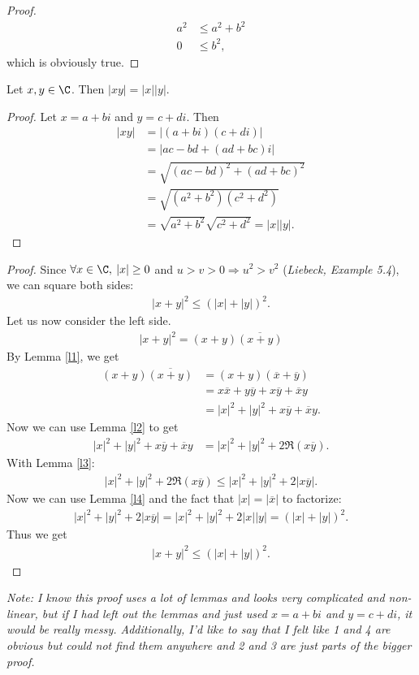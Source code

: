 \documentclass{article}
\begin{document}
\begin{adjustwidth}{2em}{0pt}
\begin{proof}
		\begin{align*}
			a^2 & \leq a^2+b^2 \\
			0   & \leq b^2,
		\end{align*}
		which is obviously true.
	\end{proof}
	\begin{lemma}
		\label{l4}
		Let $x,y\in\C$. Then $|xy|=|x||y|$.
	\end{lemma}
	\begin{proof}
		Let $x=a+bi$ and $y=c+di$. Then
		\begin{align*}
			|xy| & =|(a+bi)(c+di)|                       \\
			     & =|ac-bd+(ad+bc)i|                     \\
			     & =\sqrt{(ac-bd)^2+(ad+bc)^2}           \\
			     & =\sqrt{(a^2+b^2)(c^2+d^2)}            \\
			     & =\sqrt{a^2+b^2}\sqrt{c^2+d^2}=|x||y|.
		\end{align*}
	\end{proof}
\end{adjustwidth}
\begin{proof}
	Since $\forall x\in\C,\:|x|\geq0$ and $u>v>0\Rightarrow u^2>v^2$ (\emph{Liebeck, Example 5.4}), we can square both sides:
	\begin{align*}
		|x+y|^2\leq (|x|+|y|)^2.
	\end{align*}
	Let us now consider the left side.
	\begin{align*}
		|x+y|^2=(x+y)\overline{(x+y)}
	\end{align*}
	By Lemma \ref{l1}, we get
	\begin{align*}
		(x+y)\overline{(x+y)} & =(x+y)(\overline{x}+\overline{y})                        \\
		                      & =x\overline{x}+y\overline{y}+x\overline{y}+\overline{x}y \\
		                      & =|x|^2+|y|^2+x\overline{y}+\overline{x}y.
	\end{align*}
	Now we can use Lemma \ref{l2} to get
	\begin{align*}
		|x|^2+|y|^2+x\overline{y}+\overline{x}y & =|x|^2+|y|^2+2\Re(x\overline{y}).
	\end{align*}
	With Lemma \ref{l3}:
	\begin{align*}
		|x|^2+|y|^2+2\Re(x\overline{y})\leq |x|^2+|y|^2+2|x\overline{y}|.
	\end{align*}
	Now we can use Lemma \ref{l4} and the fact that $|x|=|\overline{x}|$ to factorize:
	\begin{align*}
		|x|^2+|y|^2+2|x\overline{y}| = |x|^2+|y|^2+2|x||y| = (|x|+|y|)^2.
	\end{align*}
	Thus we get
	\begin{align*}
		|x+y|^2\leq (|x|+|y|)^2.
	\end{align*}
\end{proof}
\emph{Note: I know this proof uses a lot of lemmas and looks very complicated and non-linear, but if I had left out the lemmas and just used $x=a+bi$ and $y=c+di$, it would be really messy. Additionally, I'd like to say that I felt like 1 and 4 are obvious but could not find them anywhere and 2 and 3 are just parts of the bigger proof.}
\end{document}
